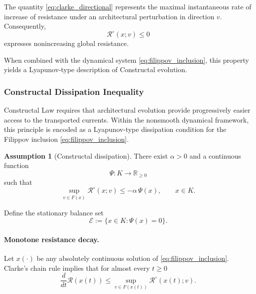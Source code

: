 \documentclass[12pt]{article}
\theoremstyle{plain}
\theoremstyle{definition}
\newtheorem{assumption}[theorem]{Assumption}
\theoremstyle{remark}
\begin{document}
The quantity \eqref{eq:clarke_directional} represents the maximal
instantaneous rate of increase of resistance under an architectural
perturbation in direction $v$.
Consequently,
\begin{equation}
\mathcal R^\circ(x;v)\le0
\label{eq:R_nonincrease}
\end{equation}
expresses nonincreasing global resistance.

When combined with the dynamical system
\eqref{eq:filippov_inclusion},
this property yields a Lyapunov-type description of Constructal
evolution.

\subsubsection{Constructal Dissipation Inequality}
\label{subsubsec:constructal_dissipation}

Constructal Law requires that architectural evolution provide
progressively easier access to the transported currents.
Within the nonsmooth dynamical framework, this principle is encoded
as a Lyapunov-type dissipation condition for the Filippov inclusion
\eqref{eq:filippov_inclusion}.

\begin{assumption}[Constructal dissipation]
\label{ass:dissipation}
There exist $\alpha>0$ and a continuous function
\[
\Psi:K\to\mathbb R_{\ge0}
\]
such that
\begin{equation}
\sup_{v\in F(x)}
\mathcal R^\circ(x;v)
\le
-\alpha\,\Psi(x),
\qquad x\in K .
\label{eq:constructal_dissipation}
\end{equation}
\end{assumption}

Define the stationary balance set
\begin{equation}
\mathcal E :=
\{x\in K : \Psi(x)=0\}.
\label{eq:balance_set_analysis}
\end{equation}

\paragraph{Monotone resistance decay.}
Let $x(\cdot)$ be any absolutely continuous solution of
\eqref{eq:filippov_inclusion}.
Clarke’s chain rule implies that for almost every $t\ge0$
\begin{equation}
\frac{d}{dt}\mathcal R(x(t))
\le
\sup_{v\in F(x(t))}
\mathcal R^\circ(x(t);v).
\label{eq:clarke_chain}
\end{equation}
\end{document}
